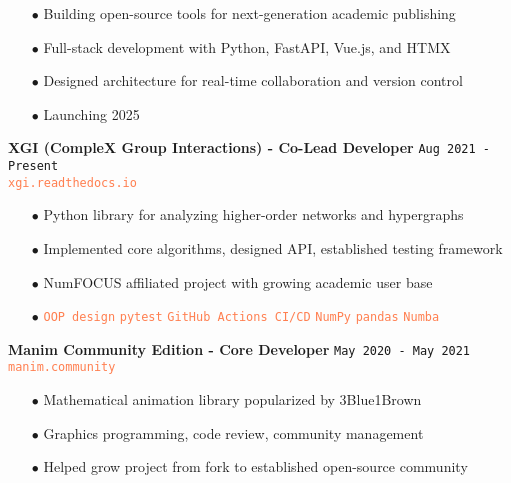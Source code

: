 \documentclass[11pt,a4paper]{article}
\newcommand{\coralbullet}{{\color{coral}$\bullet$}\space}
\newcommand{\techtag}[1]{%
    \textcolor{coral}{\texttt{\small #1}}%
}
\newcommand{\jobduration}[1]{%
    \textcolor{mediumgray}{\texttt{\small #1}}%
}
\begin{document}
\begin{itemize}[leftmargin=15pt,itemsep=3pt]
    \item[\coralbullet] Building open-source tools for next-generation academic publishing
    \item[\coralbullet] Full-stack development with Python, FastAPI, Vue.js, and HTMX
    \item[\coralbullet] Designed architecture for real-time collaboration and version control
    \item[\coralbullet] Launching 2025
\end{itemize}

\vspace{6pt}

\textbf{\large\color{navy}XGI (CompleX Group Interactions) - Co-Lead Developer} \hfill \jobduration{Aug 2021 - Present}\\
{\textcolor{coral}{\texttt{xgi.readthedocs.io}}}

\begin{itemize}[leftmargin=15pt,itemsep=3pt]
    \item[\coralbullet] Python library for analyzing higher-order networks and hypergraphs
    \item[\coralbullet] Implemented core algorithms, designed API, established testing framework
    \item[\coralbullet] NumFOCUS affiliated project with growing academic user base
    \item[\coralbullet] \techtag{OOP design} \techtag{pytest} \techtag{GitHub Actions CI/CD} \techtag{NumPy} \techtag{pandas} \techtag{Numba}
\end{itemize}

\vspace{6pt}

\textbf{\large\color{navy}Manim Community Edition - Core Developer} \hfill \jobduration{May 2020 - May 2021}\\
{\textcolor{coral}{\texttt{manim.community}}}

\begin{itemize}[leftmargin=15pt,itemsep=3pt]
    \item[\coralbullet] Mathematical animation library popularized by 3Blue1Brown
    \item[\coralbullet] Graphics programming, code review, community management
    \item[\coralbullet] Helped grow project from fork to established open-source community
\end{itemize}
\end{document}
